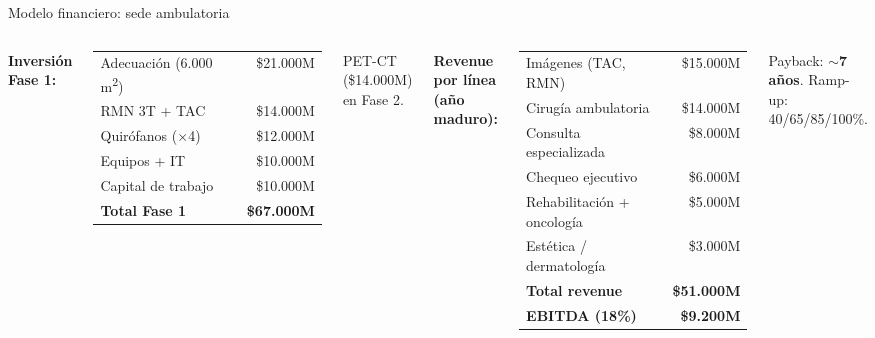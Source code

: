 \documentclass[aspectratio=169, 11pt]{beamer}
\begin{document}
\begin{frame}{Modelo financiero: sede ambulatoria}

\begin{columns}[T]
\vspace{2pt}
{\scriptsize\textbf{Inversi\'{o}n Fase 1:}}
\vspace{2pt}

{\scriptsize
\begin{tabular}{@{}lr@{}}
\toprule
Adecuaci\'{o}n (6.000 m\textsuperscript{2}) & \$21.000M \\
RMN 3T + TAC & \$14.000M \\
Quir\'{o}fanos ($\times$4) & \$12.000M \\
Equipos + IT & \$10.000M \\
Capital de trabajo & \$10.000M \\
\midrule
\textbf{Total Fase 1} & \textbf{\$67.000M} \\
\bottomrule
\end{tabular}
}

\vspace{2pt}
{\tiny PET-CT (\$14.000M) en Fase 2.}

\vspace{2pt}
{\scriptsize\textbf{Revenue por l\'{i}nea (a\~{n}o maduro):}}
\vspace{2pt}

{\scriptsize
\begin{tabular}{@{}lr@{}}
\toprule
Im\'{a}genes (TAC, RMN) & \$15.000M \\
Cirug\'{i}a ambulatoria & \$14.000M \\
Consulta especializada & \$8.000M \\
Chequeo ejecutivo & \$6.000M \\
Rehabilitaci\'{o}n + oncolog\'{i}a & \$5.000M \\
Est\'{e}tica / dermatolog\'{i}a & \$3.000M \\
\midrule
\textbf{Total revenue} & \textbf{\$51.000M} \\
\textbf{EBITDA (18\%)} & \textbf{\$9.200M} \\
\bottomrule
\end{tabular}
}

\vspace{2pt}
{\scriptsize Payback: \textbf{$\sim$7 a\~{n}os}. Ramp-up: 40/65/85/100\%.}
\end{columns}
\end{frame}
\end{document}
